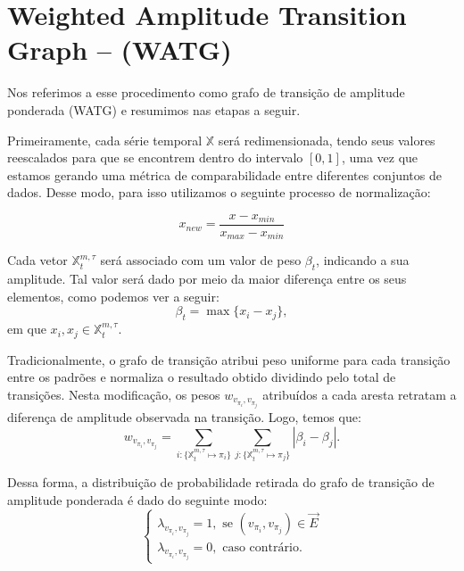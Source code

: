 \documentclass[12pt]{article}
\begin{document}
\section{Weighted Amplitude Transition Graph -- (WATG)}\label{WATG}

Nos referimos a esse procedimento como grafo de transição de amplitude ponderada (WATG) e resumimos nas etapas a seguir. 

Primeiramente, cada série temporal $\mathbb{X}$ será redimensionada, tendo seus valores reescalados para que se encontrem dentro do intervalo $[0, 1]$,  uma vez que estamos gerando uma métrica de comparabilidade entre diferentes conjuntos de dados. 
Desse modo, para isso utilizamos o seguinte processo de normalização:

\begin{equation}
    x_{new} = \frac{x - x_{min}}{x_{max} - x_{min}}
\end{equation}



Cada vetor $\mathbb{X}^{m, \tau}_t$ será associado com um valor de peso $\beta_t$, indicando a sua amplitude. 
Tal valor será dado por meio da maior diferença entre os seus elementos, como podemos ver a seguir:
\begin{equation}
    \beta_t = \max\{x_i - x_j\},
\end{equation}
em que $x_i, x_j \in \mathbb{X}^{m, \tau}_t$.

Tradicionalmente, o grafo de transição atribui peso uniforme para cada transição entre os padrões e normaliza o resultado obtido dividindo pelo total de transições.
Nesta modificação, os pesos $w_{v_{\pi_i}, v_{\pi_j}}$ atribuídos a cada aresta retratam a diferença de amplitude observada na transição.
Logo, temos que:
\begin{equation}
    w_{v_{\pi_i}, v_{\pi_j}} =  \sum_{i : \{\mathbb{X}^{m,\tau}_t \mapsto \pi_i\}} \sum_{j : \{\mathbb{X}^{m,\tau}_t \mapsto \pi_j\}} |\beta_i - \beta_j| .
\end{equation}

Dessa forma, a distribuição de probabilidade retirada do grafo de transição de amplitude ponderada é dado do seguinte modo:
\begin{equation}
    \left\{\begin{array}{l}
        \lambda_{v_{\pi_i}, v_{\pi_j}} = 1, \text{ se } (v_{\pi_i}, v_{\pi_j}) \in \vec{E} \\
        \lambda_{v_{\pi_i}, v_{\pi_j}} = 0, \text{ caso contrário}.
        \end{array}\right.
\end{equation}
\end{document}

